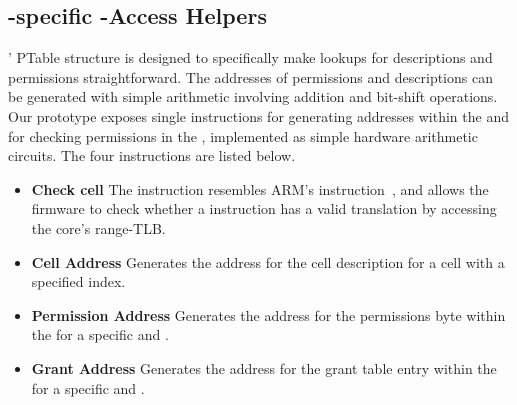 \subsection{\seccells-specific \ptable-\gtable Access Helpers}
\seccells' PTable structure is designed to specifically make lookups for
\cell descriptions and permissions straightforward.
The addresses of permissions and descriptions can be generated with
simple arithmetic involving addition and bit-shift operations.
Our prototype exposes single instructions for generating addresses
within the \ptable and for checking permissions in the \ptable, 
implemented as simple hardware arithmetic circuits.
The four instructions are listed below.
\begin{itemize}
  \item \textbf{Check cell} The  instruction resembles ARM's
     instruction~\cite{ARMAT}, and allows the firmware to check
    whether a instruction has a valid translation by accessing the core's
    range-TLB.

  \item \textbf{Cell Address} Generates the address for the cell description for
    a cell with a specified index.

  \item \textbf{Permission Address} Generates the address for the permissions
    byte within the \ptable for a specific \cell and \secdiv.

  \item \textbf{Grant Address} Generates the address for the grant table entry
    within the \gtable for a specific \cell and \secdiv.
\end{itemize}


